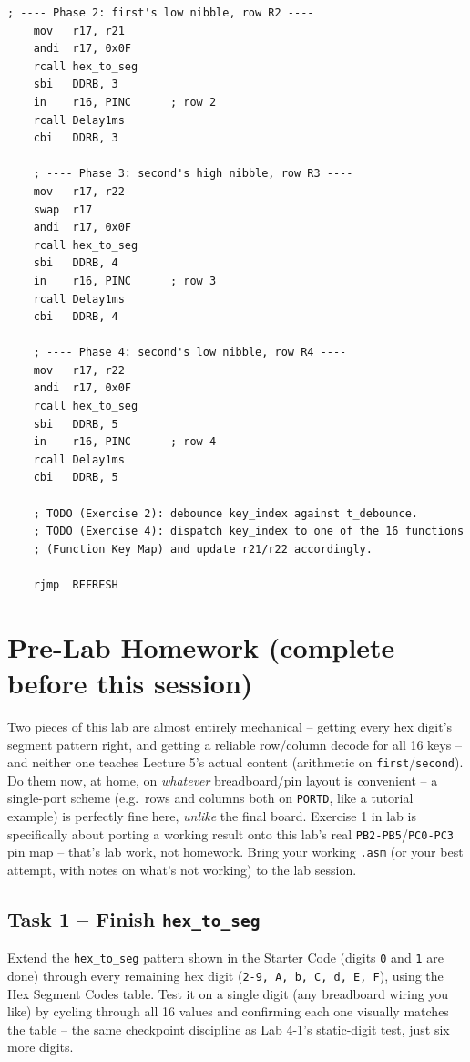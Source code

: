 \documentclass[11pt]{article}
\begin{document}
\begin{lstlisting}[style=asm]
    ; ---- Phase 2: first's low nibble, row R2 ----
    mov   r17, r21
    andi  r17, 0x0F
    rcall hex_to_seg
    sbi   DDRB, 3
    in    r16, PINC      ; row 2
    rcall Delay1ms
    cbi   DDRB, 3

    ; ---- Phase 3: second's high nibble, row R3 ----
    mov   r17, r22
    swap  r17
    andi  r17, 0x0F
    rcall hex_to_seg
    sbi   DDRB, 4
    in    r16, PINC      ; row 3
    rcall Delay1ms
    cbi   DDRB, 4

    ; ---- Phase 4: second's low nibble, row R4 ----
    mov   r17, r22
    andi  r17, 0x0F
    rcall hex_to_seg
    sbi   DDRB, 5
    in    r16, PINC      ; row 4
    rcall Delay1ms
    cbi   DDRB, 5

    ; TODO (Exercise 2): debounce key_index against t_debounce.
    ; TODO (Exercise 4): dispatch key_index to one of the 16 functions
    ; (Function Key Map) and update r21/r22 accordingly.

    rjmp  REFRESH
\end{lstlisting}

\section*{Pre-Lab Homework (complete before this session)}
Two pieces of this lab are almost entirely mechanical -- getting every hex
digit's segment pattern right, and getting a reliable row/column decode for
all 16 keys -- and neither one teaches Lecture 5's actual content (arithmetic
on \texttt{first}/\texttt{second}). Do them now, at home, on \emph{whatever}
breadboard/pin layout is convenient -- a single-port scheme (e.g.\ rows and
columns both on \texttt{PORTD}, like a tutorial example) is perfectly fine
here, \emph{unlike} the final board. Exercise 1 in lab is specifically about
porting a working result onto this lab's real \texttt{PB2-PB5}/\texttt{PC0-PC3}
pin map -- that's lab work, not homework. Bring your working \texttt{.asm} (or
your best attempt, with notes on what's not working) to the lab session.

\subsection*{Task 1 -- Finish \texttt{hex\_to\_seg}}
Extend the \texttt{hex\_to\_seg} pattern shown in the Starter Code (digits
\texttt{0} and \texttt{1} are done) through every remaining hex digit
(\texttt{2-9, A, b, C, d, E, F}), using the Hex Segment Codes table. Test it on
a single digit (any breadboard wiring you like) by cycling through all 16
values and confirming each one visually matches the table -- the same
checkpoint discipline as Lab 4-1's static-digit test, just six more digits.
\end{document}
